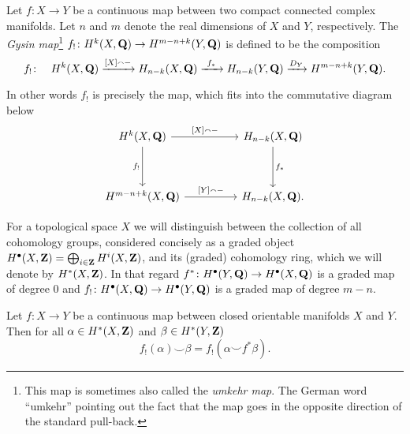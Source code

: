 \begin{definition}
    \label{Definition of umkehr map}
    Let $f \colon X \to Y$ be a continuous map between two compact connected complex manifolds. Let $n$ and $m$ denote the real dimensions of $X$ and $Y$, respectively.
    The \emph{Gysin map}\footnote{This map is sometimes also called the \emph{umkehr map}. The German word ``umkehr'' pointing out the fact that the map goes in the opposite direction of the standard pull-back.} $f_! \colon H^{k}(X, \mathbf Q) \to H^{m-n+k}(Y, \mathbf Q)$ is defined to be the composition
    \[
        f_! \colon \quad H^{k}(X, \mathbf Q) \xrightarrow{[X] \smallfrown -} H_{n-k}(X, \mathbf Q) \xrightarrow{\ f_* \ } H_{n-k}(Y, \mathbf Q) \xrightarrow{D_Y} H^{m-n+k}(Y, \mathbf Q).
    \]
\end{definition}

\begin{remark}
    In other words $f_!$ is precisely the map, which fits into the commutative diagram below
    \[\begin{tikzcd}
        \cohom{k}{X}{\Q} && H_{n-k}(X, \Q) \\
        \\
        \cohom{m-n+k}{X}{\Q} && H_{n-k}(X, \Q).
        \arrow["{[X] \smallfrown -}", from=1-1, to=1-3]
        \arrow["{f_!}"', from=1-1, to=3-1]
        \arrow["{f_*}", from=1-3, to=3-3]
        \arrow["{[Y] \smallfrown -}", from=3-1, to=3-3]
    \end{tikzcd}\]
\end{remark}

\begin{remark}
    For a topological space $X$ we will distinguish between the collection of all cohomology groups, considered concisely as a graded object $H^{\bullet}(X, \mathbf Z) = \bigoplus_{i\in \mathbf Z} H^{i}(X, \mathbf Z)$, and its (graded) cohomology ring, which we will denote by $H^{*}(X, \mathbf Z)$. In that regard $f^* \colon H^{\bullet}(Y, \mathbf Q) \to H^{\bullet}(X, \mathbf Q)$ is a graded map of degree $0$ and $f_! \colon H^{\bullet}(X, \mathbf Q) \to H^{\bullet}(Y, \mathbf Q)$ is a graded map of degree $m - n$.
\end{remark}

\begin{proposition}
    \label{cohomological projection formula}
    \emph{\cite[\S VI, Proposition 14.1]{Bredon1993}}
    Let $f \colon X \to Y$ be a continuous map between closed orientable manifolds $X$ and $Y$. Then for all $\alpha \in H^{*}(X, \mathbf Z)$ and $\beta \in H^{*}(Y, \mathbf Z)$
    \begin{equation}
        \label{eq: cohomological projection formula}
        f_!(\alpha) \smallsmile \beta = f_!(\alpha \smallsmile f^*\beta).
    \end{equation}
\end{proposition}

